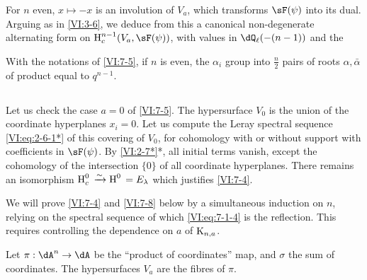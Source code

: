 For $n$ even, $x\mapsto -x$ is an involution of $V_a$, which transforms
$\sF(\psi)$ into its dual. Arguing as in \ref{VI:3-6}, we deduce from this a
canonical non-degenerate alternating form on $\h_c^{n-1}(V_a,\sF(\psi))$,
with values in $\dQ_\ell(-(n-1))$ and the 





\begin{corollary_}\label{VI:7-6}
With the notations of \ref{VI:7-5}, if $n$ is even, the $\alpha_i$ group
into $\frac n 2$ pairs of roots $\alpha,\bar\alpha$ of product equal to
$q^{n-1}$.
\end{corollary_}





\subsection{}\label{VI:7-7}

Let us check the case $a=0$ of \ref{VI:7-5}. The hypersurface $V_0$ is the union
of the coordinate hyperplanes $x_i=0$. Let us compute the Leray spectral
sequence \eqref{VI:eq:2-6-1*} of this covering of $V_0$, for cohomology with or
without support with coefficients in $\sF(\psi)$. By \ref{VI:2-7*}*, all
initial terms vanish, except the cohomology of the intersection $\{0\}$ of
all coordinate hyperplanes. There remains an isomorphism
$\operatorname{H}_c^0{}\xrightarrow\sim \operatorname{H}^0{}=E_\lambda$ which justifies \ref{VI:7-4}.

We will prove \ref{VI:7-4} and \ref{VI:7-8} below by a simultaneous induction
on $n$, relying on the spectral sequence of which
\eqref{VI:eq:7-1-4} is the reflection. This requires controlling the dependence
on $a$ of $\textnormal{K}_{n,a}$.

Let $\pi:\dA^n \to \dA$ be the ``product of coordinates'' map, and
$\sigma$ the sum of coordinates. The hypersurfaces $V_a$ are the fibres of
$\pi$. 





